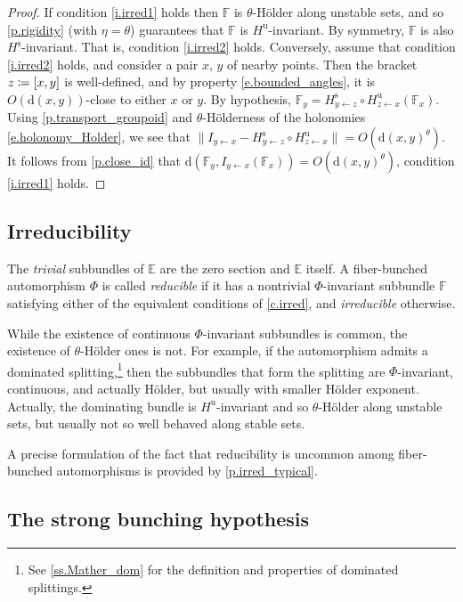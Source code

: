 \documentclass[JEP,XML,SOM,Unicode]{cedram}
\def\vcentcolon{\mathrel{\mathop\ordinarycolon}}
\providecommand\ordinarycolon{:}
\providecommand*\coloneqq{\vcentcolon\mathrel{\mkern-1.2mu}=}
\theoremstyle{plain}
\theoremstyle{definition}
\newcommand{\EE}{\mathbb{E}}
\newcommand{\FF}{\mathbb{F}}
\newcommand{\dd}{\mathrm{d}}
\newcommand{\uu}{\mathrm{u}}
\renewcommand{\ss}{\mathrm{s}}
\begin{document}
\begin{proof}
If condition \eqref{i.irred1} holds then $\FF$ is $\theta$-Hölder along unstable sets, and so \cref{p.rigidity} (with $\eta = \theta$) guarantees that $\FF$ is $H^\uu$-invariant. By symmetry, $\FF$ is also $H^\ss$-invariant. That is, condition \eqref{i.irred2} holds.
Conversely, assume that condition \eqref{i.irred2} holds, and consider a pair $x$, $y$ of nearby points.
Then the bracket $z \coloneqq [x,y]$ is well-defined, and by property \eqref{e.bounded_angles}, it is $O(\dd(x,y))$-close to either $x$ or $y$.
By hypothesis, $\FF_y = H^\ss_{y\gets z} \circ H^\uu_{z \gets x} (\FF_x)$.
Using \cref{p.transport_groupoid} and $\theta$-Hölderness of the holonomies \eqref{e.holonomy_Holder}, we see that $\|I_{y \gets x} - H^\ss_{y\gets z} \circ H^\uu_{z \gets x}\| = O(\dd(x,y)^\theta)$.
It follows from \cref{p.close_id} that
$\dd ( \FF_y, I_{y \gets x} (\FF_x)) = O(\dd(x,y)^\theta)$, \ie condition \eqref{i.irred1} holds.
\end{proof}

\subsection{Irreducibility}

The \emph{trivial} subbundles of $\EE$ are the zero section and $\EE$ itself.
A fiber-bunched automorphism $\Phi$ is called \emph{reducible} if it has a nontrivial $\Phi$-invariant subbundle $\FF$ satisfying either of the equivalent conditions of \cref{c.irred}, and \emph{irreducible} otherwise.

While the existence of continuous $\Phi$-invariant subbundles is common, the existence of $\theta$-Hölder ones is not. For example, if the automorphism admits a dominated splitting,\footnote{See \cref{ss.Mather_dom} for the definition and properties of dominated splittings.} then the subbundles that form the splitting are $\Phi$-invariant, continuous, and actually Hölder, but usually with smaller Hölder exponent. Actually, the dominating bundle is $H^\uu$-invariant and so $\theta$-Hölder along unstable sets, but usually not so well behaved along stable sets.

A precise formulation of the fact that reducibility is uncommon among fiber-bunched automorphisms is provided by \cref{p.irred_typical}.

\subsection{The strong bunching hypothesis}
\end{document}
